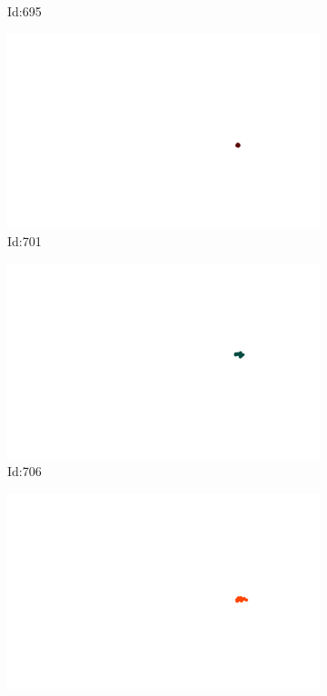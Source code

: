 \documentclass[12pt,twoside]{report}
\begin{document}
\begin{figure}
\begin{subfigure}[b]{0.20\textwidth}
\caption{Id:695}
\end{subfigure}
\begin{subfigure}[b]{0.20\textwidth}
\centering
\includegraphics[width=\textwidth]{../trajectories/701.png}
\caption{Id:701}
\end{subfigure}
\begin{subfigure}[b]{0.20\textwidth}
\centering
\includegraphics[width=\textwidth]{../trajectories/706.png}
\caption{Id:706}
\end{subfigure}
\begin{subfigure}[b]{0.20\textwidth}
\centering
\includegraphics[width=\textwidth]{../trajectories/723.png}

\end{subfigure}
\end{figure}
\end{document}
